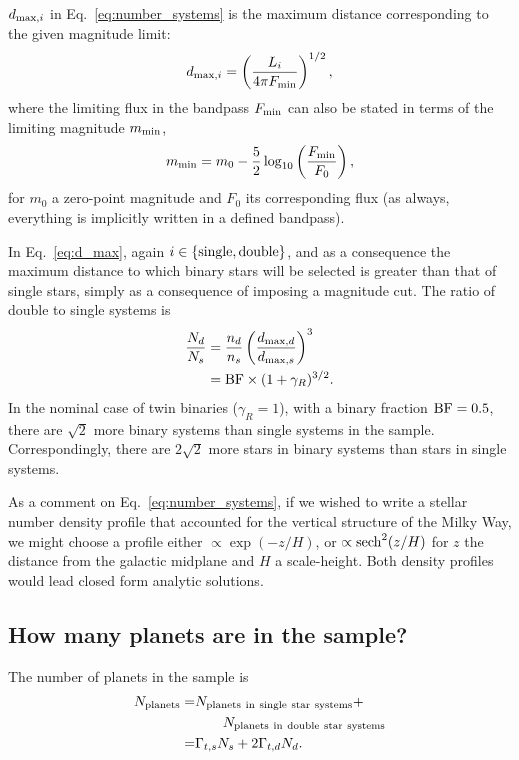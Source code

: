 \documentclass{emulateapj}
\begin{document}
$d_{{\rm max},i}$ in Eq.~\ref{eq:number_systems} is the maximum distance 
corresponding to the given magnitude limit:
\begin{equation}
d_{{\rm max},i} = \left(\frac{L_{i}}{4 \pi F_{{\rm min}}}\right)^{1/2},
\label{eq:d_max}
\end{equation}
where the limiting flux in the bandpass $F_{{\rm min}}$ can also be 
stated in terms of the limiting magnitude $m_{{\rm min}}$,
\begin{equation}
m_{{\rm min}} = m_{0} - \frac{5}{2} \log_{10} \left(\frac{F_{{\rm 
min}}}{F_{0}}\right),
\end{equation}
for $m_{0}$ a zero-point magnitude and $F_{0}$ its corresponding flux (as 
always, everything is implicitly written in a defined bandpass).

In Eq.~\ref{eq:d_max}, again $i\in{\rm \{single,double\} }$, and as a 
consequence the maximum distance to which binary stars will be selected is 
greater than that of single stars, simply as a consequence of imposing a 
magnitude cut.
The ratio of double to single systems is
\begin{align}
\frac{N_d}{N_s} &= 
	\frac{n_d}{n_s} \left(\frac{d_{{\rm max}, d} }{d_{{\rm max}, s}}\right)^3 \\
&= {\rm BF} \times (1+\gamma_R)^{3/2}.
\end{align}
In the nominal case of twin binaries ($\gamma_R = 1$), with a binary fraction 
${\rm BF} = 0.5$, there are 
$\sqrt{2}$ more binary systems than single systems in the sample.
Correspondingly, there are $2\sqrt{2}$ more stars in binary systems than stars 
in single systems.

As a comment on Eq.~\ref{eq:number_systems}, if 
we wished to write a stellar number density profile that accounted for the 
vertical structure of the Milky Way, we might choose a profile either 
$\propto \exp(-z/H)$, or $\propto {\rm sech}^2(z/H)$ for $z$ the distance from 
the galactic midplane and $H$ a scale-height. Both density profiles would lead 
closed form analytic solutions.



\subsection{How many planets are in the sample?}

The number of planets in the sample is
\begin{align}
N_{\rm planets} =& N_{\rm planets\ in\ single\ star\ systems}  +  \\
				  &\quad\quad N_{\rm planets\ in\ double\ star\ systems} 
				  \nonumber \\
			   =& \Gamma_{t,s} N_s + 2 \Gamma_{t,d} N_d.
\end{align}
\end{document}
